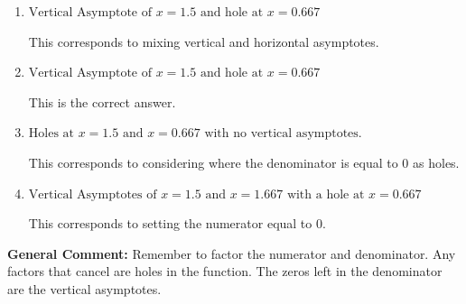\documentclass{extbook}[14pt]
\begin{document}
\begin{enumerate}
{\begin{enumerate}[label=\Alph*.]
This corresponds to not factoring out the hole.
\item \( \text{Vertical Asymptote of } x = 1.5 \text{ and hole at } x = 0.667 \)

This corresponds to mixing vertical and horizontal asymptotes.
\item \( \text{Vertical Asymptote of } x = 1.5 \text{ and hole at } x = 0.667 \)

This is the correct answer.
\item \( \text{Holes at } x = 1.5 \text{ and } x = 0.667 \text{ with no vertical asymptotes.} \)

This corresponds to considering where the denominator is equal to 0 as holes.
\item \( \text{Vertical Asymptotes of } x = 1.5 \text{ and } x = 1.667 \text{ with a hole at } x = 0.667 \)

This corresponds to setting the numerator equal to 0.
\end{enumerate}

\textbf{General Comment:} Remember to factor the numerator and denominator. Any factors that cancel are holes in the function. The zeros left in the denominator are the vertical asymptotes.
}
\end{enumerate}
\end{document}
